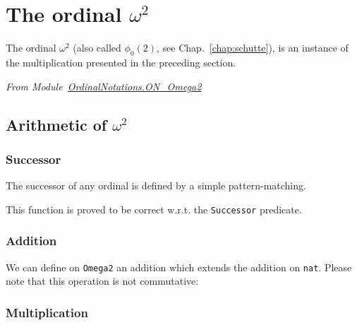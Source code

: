 
\section{The ordinal \texorpdfstring{$\omega^2$}{omega2}}

The ordinal $\omega^2$ (also called $\phi_0(2)$, see Chap.~\ref{chap:schutte}), is an instance of the multiplication presented in the preceding section.

\vspace{4pt}
\noindent\emph{From Module~\href{../theories/html/hydras.OrdinalNotations.ON_Omega2.html}{OrdinalNotations.ON\_Omega2}}


\subsection{Arithmetic of \texorpdfstring{$\omega^2$}{omega^2}} 

\subsubsection{Successor}

The successor of any ordinal is defined by a simple pattern-matching.




This function is proved to be correct w.r.t. the \texttt{Successor} predicate.






\subsubsection{Addition}

We can define on \texttt{Omega2} an addition which extends the addition on \texttt{nat}. Please note that this operation is not commutative:



\subsubsection{Multiplication}

